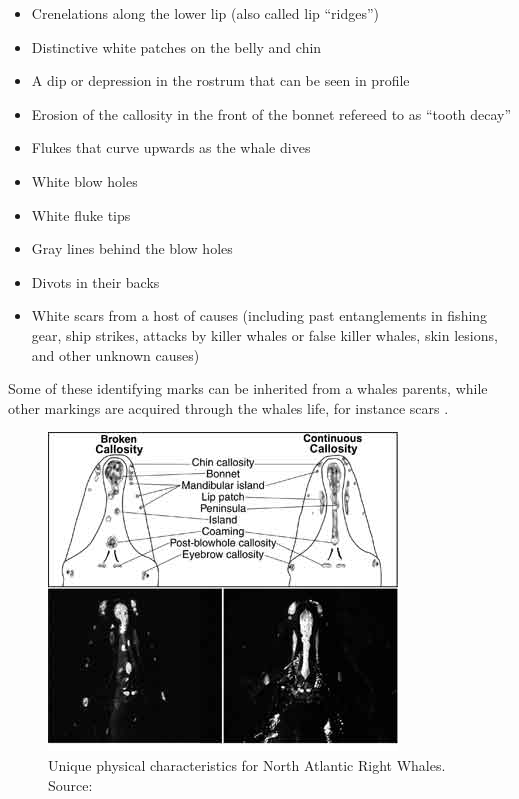\begin{itemize}
	\item Crenelations along the lower lip (also called lip “ridges”)
	\item Distinctive white patches on the belly and chin
	\item A dip or depression in the rostrum that can be seen in profile
	\item Erosion of the callosity in the front of the bonnet refereed to as “tooth decay”
	\item Flukes that curve upwards as the whale dives
	\item White blow holes
	\item White fluke tips
	\item Gray lines behind the blow holes
	\item Divots in their backs
	\item White scars from a host of causes (including past entanglements in fishing gear, ship strikes, attacks by killer whales or false killer whales, skin lesions, and other unknown causes)
\end{itemize}

Some of these identifying marks can be inherited from a whales parents, while other markings are acquired through the whales life, for instance scars \cite{neaq:whale-identity-markings}.

\begin{figure}
	\centering
	\includegraphics[width=\linewidth]{Images/callosity_comparison}
	\caption{Unique physical characteristics for North Atlantic Right Whales. Source: \cite{neaq:whale-identity}}
	\label{fig:whale-collosity}
\end{figure}

